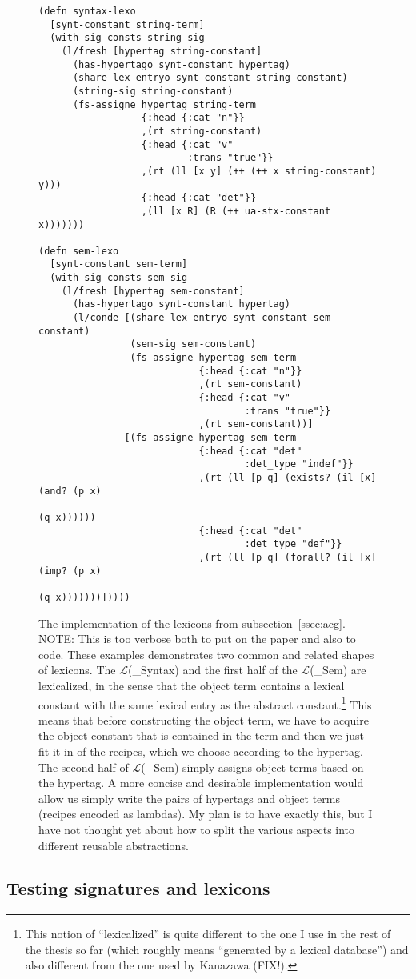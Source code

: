 \begin{figure}
  \centering
\begin{verbatim}
(defn syntax-lexo
  [synt-constant string-term]
  (with-sig-consts string-sig
    (l/fresh [hypertag string-constant]
      (has-hypertago synt-constant hypertag)
      (share-lex-entryo synt-constant string-constant)
      (string-sig string-constant)
      (fs-assigne hypertag string-term
                  {:head {:cat "n"}}
                  ,(rt string-constant)
                  {:head {:cat "v"
                          :trans "true"}}
                  ,(rt (ll [x y] (++ (++ x string-constant) y)))
                  {:head {:cat "det"}}
                  ,(ll [x R] (R (++ ua-stx-constant x)))))))

(defn sem-lexo
  [synt-constant sem-term]
  (with-sig-consts sem-sig
    (l/fresh [hypertag sem-constant]
      (has-hypertago synt-constant hypertag)
      (l/conde [(share-lex-entryo synt-constant sem-constant)
                (sem-sig sem-constant)
                (fs-assigne hypertag sem-term
                            {:head {:cat "n"}}
                            ,(rt sem-constant)
                            {:head {:cat "v"
                                    :trans "true"}}
                            ,(rt sem-constant))]
               [(fs-assigne hypertag sem-term
                            {:head {:cat "det"
                                    :det_type "indef"}}
                            ,(rt (ll [p q] (exists? (il [x] (and? (p x)
                                                                  (q x))))))
                            {:head {:cat "det"
                                    :det_type "def"}}
                            ,(rt (ll [p q] (forall? (il [x] (imp? (p x)
                                                                  (q x)))))))]))))

\end{verbatim}
  \caption{\label{fig:lex-impl} The implementation of the lexicons from
    subsection~\ref{ssec:acg}. NOTE: This is too verbose both to put on
    the paper and also to code. These examples demonstrates two common
    and related shapes of lexicons. The $\mathcal{L}$(\_{Syntax}) and
    the first half of the $\mathcal{L}$(\_{Sem}) are lexicalized, in the
    sense that the object term contains a lexical constant with the same
    lexical entry as the abstract constant.\footnote{This notion of
      ``lexicalized'' is quite different to the one I use in the rest of
      the thesis so far (which roughly means ``generated by a lexical
      database'') and also different from the one used by Kanazawa
      (FIX!).} This means that before constructing the object term, we
    have to acquire the object constant that is contained in the term
    and then we just fit it in of the recipes, which we choose according
    to the hypertag. The second half of $\mathcal{L}$(\_{Sem}) simply
    assigns object terms based on the hypertag. A more concise and
    desirable implementation would allow us simply write the pairs of
    hypertags and object terms (recipes encoded as lambdas). My plan is
    to have exactly this, but I have not thought yet about how to split
    the various aspects into different reusable abstractions.}
\end{figure}

\subsection{Testing signatures and lexicons}

